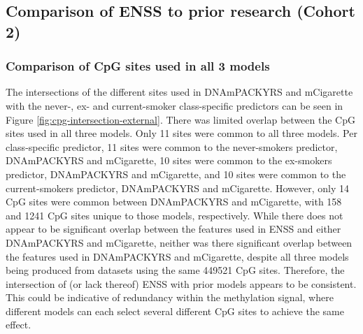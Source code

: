 \documentclass{article} %
\begin{document}
\newpage
\subsection{Comparison of ENSS to prior research (Cohort 2)} \label{sec:model-comparisons}


\subsubsection{Comparison of CpG sites used in all 3 models} \label{sec:sites-comparison}

The intersections of the different sites used in DNAmPACKYRS and mCigarette with the never-, ex- and current-smoker class-specific predictors can be seen in Figure \ref{fig:cpg-intersection-external}. There was limited overlap between the CpG sites used in all three models. Only 11 sites were common to all three models. Per class-specific predictor, 11 sites were common to the never-smokers predictor, DNAmPACKYRS and mCigarette, 10 sites were common to the ex-smokers predictor, DNAmPACKYRS and mCigarette, and 10 sites were common to the current-smokers predictor, DNAmPACKYRS and mCigarette. However, only 14 CpG sites were common between DNAmPACKYRS and mCigarette, with 158 and 1241 CpG sites unique to those models, respectively. While there does not appear to be significant overlap between the features used in ENSS and either DNAmPACKYRS and mCigarette, neither was there significant overlap between the features used in DNAmPACKYRS and mCigarette, despite all three models being produced from datasets using the same \num{449521} CpG sites. Therefore, the intersection of (or lack thereof) ENSS with prior models appears to be consistent. This could be indicative of redundancy within the methylation signal, where different models can each select several different CpG sites to achieve the same effect.
\end{document}
